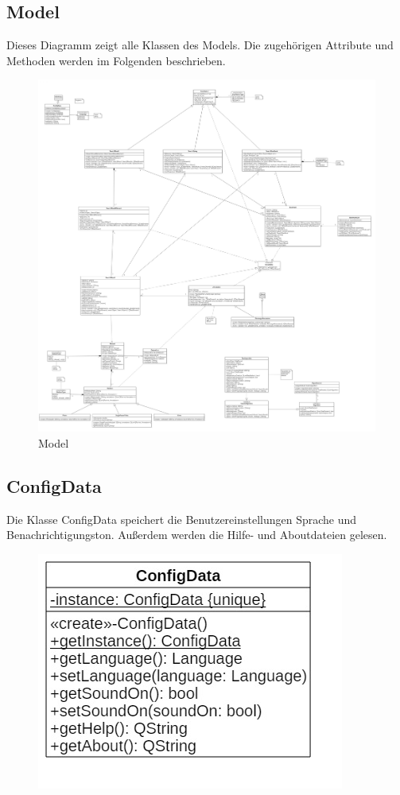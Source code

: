 \subsection{Model}
Dieses Diagramm zeigt alle Klassen des Models. Die zugehörigen Attribute und Methoden werden im Folgenden beschrieben.

\begin{figure}[H]
\includegraphics[width=1\linewidth]{img/Klassendiagramm/Model}
\caption{Model}
\label{fig:model}
\end{figure}


\subsection*{ConfigData}

Die Klasse ConfigData speichert die Benutzereinstellungen Sprache und Benachrichtigungston. Außerdem werden die Hilfe- und Aboutdateien gelesen.

\begin{figure}[H]
\centering
\includegraphics[scale=0.5]{img/Klassendiagramm/Klassen/Model/ConfigData}
\label{fig:configData}
\end{figure}

